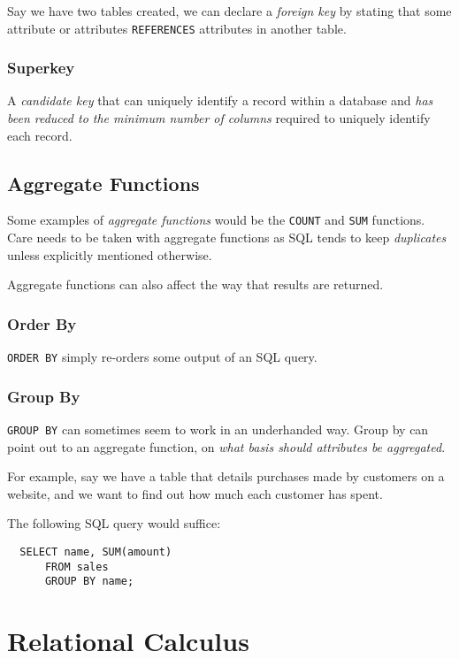\documentclass{article}
\begin{document}
Say we have two tables created, we can declare a \textit{foreign key} by stating that some attribute or attributes \texttt{REFERENCES} attributes in another table.

\subsubsection{Superkey}

A \textit{candidate key} that can uniquely identify a record within a database and \textit{has been reduced to the minimum number of columns} required to uniquely identify each record.

\filbreak
\subsection{Aggregate Functions}

Some examples of \textit{aggregate functions} would be the \texttt{COUNT} and \texttt{SUM} functions. Care needs to be taken with aggregate functions as SQL tends to keep \textit{duplicates} unless explicitly mentioned otherwise. 

Aggregate functions can also affect the way that results are returned.

\subsubsection{Order By}

\texttt{ORDER BY} simply re-orders some output of an SQL query. 

\subsubsection{Group By}

\texttt{GROUP BY} can sometimes seem to work in an underhanded way. Group by can point out to an aggregate function, on \textit{what basis should attributes be aggregated}.

For example, say we have a table that details purchases made by customers on a website, and we want to find out how much each customer has spent.

The following SQL query would suffice:

\begin{lstlisting}
  SELECT name, SUM(amount)
      FROM sales
      GROUP BY name;
\end{lstlisting}

\section{Relational Calculus}
\end{document}
